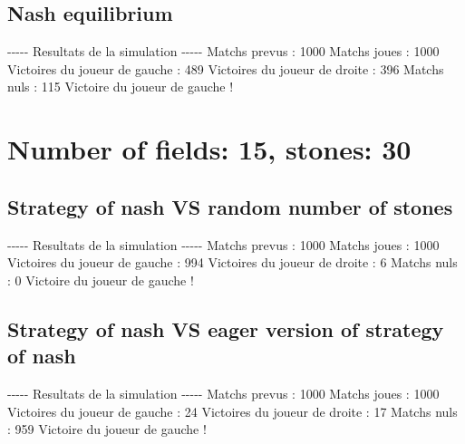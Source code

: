 \documentclass{article}%
\begin{document}
%
\subsection{Nash equilibrium}%
\label{subsec:Nash equilibrium}%
{-}{-}{-}{-}{-} Resultats de la simulation {-}{-}{-}{-}{-}\newline%
		\newline%
Matchs prevus : 1000\newline%
Matchs joues : 1000\newline%
\newline%
Victoires du joueur de gauche : 489\newline%
Victoires du joueur de droite : 396\newline%
Matchs nuls : 115\newline%
\newline%
Victoire du joueur de gauche !

%
\section{Number of fields: 15, stones: 30}%
\label{sec:Number of fields 15, stones 30}%
\subsection{Strategy of nash VS random number of stones}%
\label{subsec:Strategy of nash VS random number of stones}%
{-}{-}{-}{-}{-} Resultats de la simulation {-}{-}{-}{-}{-}\newline%
		\newline%
Matchs prevus : 1000\newline%
Matchs joues : 1000\newline%
\newline%
Victoires du joueur de gauche : 994\newline%
Victoires du joueur de droite : 6\newline%
Matchs nuls : 0\newline%
\newline%
Victoire du joueur de gauche !

%
\subsection{Strategy of nash VS eager version of strategy of nash}%
\label{subsec:Strategy of nash VS eager version of strategy of nash}%
{-}{-}{-}{-}{-} Resultats de la simulation {-}{-}{-}{-}{-}\newline%
		\newline%
Matchs prevus : 1000\newline%
Matchs joues : 1000\newline%
\newline%
Victoires du joueur de gauche : 24\newline%
Victoires du joueur de droite : 17\newline%
Matchs nuls : 959\newline%
\newline%
Victoire du joueur de gauche !
\end{document}
